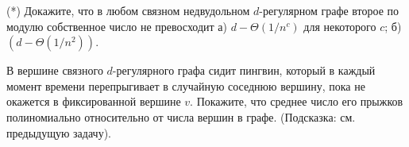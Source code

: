 \begin{ptask}{10}(*)
	Докажите, что в любом связном недвудольном $d$-регулярном графе второе по модулю
	собственное число не превосходит а) $d - \Theta(1 / n^c)$ для некоторого $c$;
	б) $(d - \Theta(1 / n^2))$.
\end{ptask}

\begin{ptask}{11}
	В вершине связного $d$-регулярного графа сидит пингвин, который в каждый момент
	времени перепрыгивает в случайную соседнюю вершину, пока не окажется в
    фиксированной вершине $v$. Покажите, что среднее число его прыжков полиномиально
    относительно от числа вершин в графе. (Подсказка: см. предыдущую задачу).
\end{ptask}